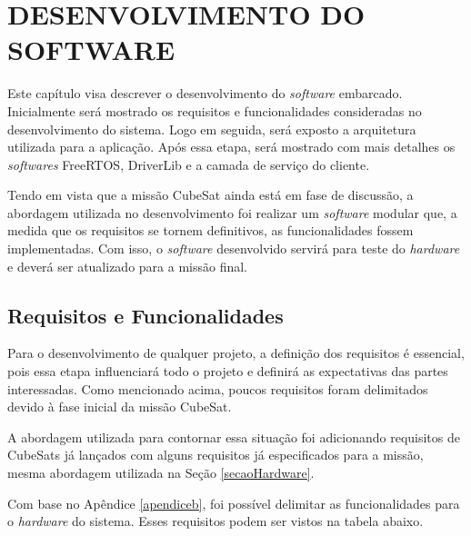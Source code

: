 \chapter[DESENVOLVIMENTO DO SOFTWARE]{DESENVOLVIMENTO DO SOFTWARE}

Este capítulo visa descrever o desenvolvimento do \textit{software} embarcado. Inicialmente será mostrado os requisitos e funcionalidades consideradas no desenvolvimento do sistema. Logo em seguida, será exposto a arquitetura utilizada para a aplicação. Após essa etapa, será mostrado com mais detalhes os \textit{softwares} FreeRTOS, DriverLib e a camada de serviço do cliente. 

Tendo em vista que a missão CubeSat ainda está em fase de discussão, a abordagem utilizada no desenvolvimento foi realizar um \textit{software} modular que, a medida que os requisitos se tornem definitivos, as funcionalidades fossem implementadas. Com isso, o \textit{software} desenvolvido servirá para teste do \textit{hardware} e deverá ser atualizado para a missão final.

\section{Requisitos e Funcionalidades}

Para o desenvolvimento de qualquer projeto, a definição dos requisitos é essencial, pois essa etapa influenciará todo o projeto e definirá as expectativas das partes interessadas. Como mencionado acima, poucos requisitos foram delimitados devido à fase inicial da missão CubeSat.

A abordagem utilizada para contornar essa situação foi adicionando requisitos de CubeSats já lançados com alguns requisitos já especificados para a missão, mesma abordagem utilizada na Seção \ref{secaoHardware}.

Com base no Apêndice \ref{apendiceb}, foi possível delimitar as funcionalidades para o \textit{hardware} do sistema. Esses requisitos podem ser vistos na tabela abaixo.

